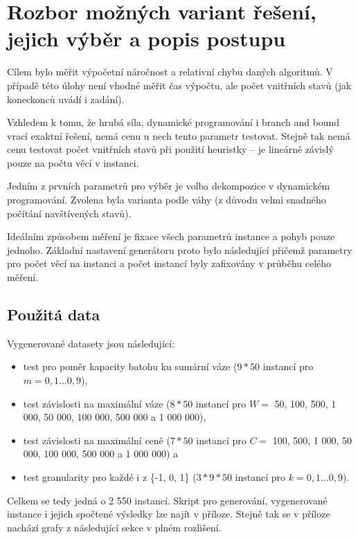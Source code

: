 \documentclass[a4paper]{article}
\begin{document}
\section{Rozbor možných variant řešení, jejich výběr a popis postupu}
	Cílem bylo měřit výpočetní náročnost a relativní chybu daných algoritmů. V případě této úlohy není vhodné měřit čas výpočtu, ale počet vnitřních stavů (jak koneckonců uvádí i zadání).
	
	Vzhledem k tomu, že hrubá síla, dynamické programování i branch and bound vrací exaktní řešení, nemá cenu u nech tento parametr testovat. Stejně tak nemá cenu testovat počet vnitřních stavů při použití heuristky -- je lineárně závislý pouze na počtu věcí v instanci.
	
	Jedním z prvních parametrů pro výběr je volba dekompozice v dynamickém programování. Zvolena byla varianta podle váhy (z důvodu velmi snadného počítání navštívených stavů).
	
	Ideálním způsobem měření je fixace všech parametrů instance a pohyb pouze jednoho. Základní nastavení generátoru proto bylo následující  přičemž parametry pro počet věcí na instanci a počet instancí byly zafixovány v průběhu celého měření.
	
	\subsection{Použitá data}
		Vygenerované datasety jsou následující:
		\begin{itemize}
			\item test pro poměr kapacity batohu ku sumární váze ($9*50$ instancí pro $m = 0,1...0,9$),
			\item test závislosti na maximální váze ($8*50$ instancí pro $ W =$ 50, 100, 500, 1 000, 50 000, 100 000, 500 000 a 1 000 000),
			\item test závislosti na maximální ceně ($7*50$ instancí pro $C =$ 100, 500, 1 000, 50 000, 100 000, 500 000 a 1 000 000) a
			\item test granularity pro každé i z \{-1, 0, 1\} ($3*9*50$ instancí pro $k = 0,1...0,9$).
		\end{itemize}
	
		Celkem se tedy jedná o 2 550 instancí. Skript pro generování, vygenerované instance i jejich spočtené výsledky lze najít v příloze. Stejně tak se v příloze nachází grafy z následující sekce v plném rozlišení.		
\end{document}

